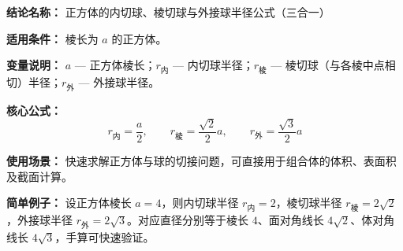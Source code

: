 \textbf{结论名称：} 正方体的内切球、棱切球与外接球半径公式（三合一）

\textbf{适用条件：} 棱长为 \( a \) 的正方体。

\textbf{变量说明：} \( a \) — 正方体棱长；\( r_{\text{内}} \) — 内切球半径；\( r_{\text{棱}} \) — 棱切球（与各棱中点相切）半径；\( r_{\text{外}} \) — 外接球半径。

\textbf{核心公式：}
\[
\boxed{r_{\text{内}} = \frac{a}{2},\qquad r_{\text{棱}} = \frac{\sqrt{2}}{2}a,\qquad r_{\text{外}} = \frac{\sqrt{3}}{2}a}
\]

\textbf{使用场景：} 快速求解正方体与球的切接问题，可直接用于组合体的体积、表面积及截面计算。

\textbf{简单例子：} 设正方体棱长 \( a=4 \)，则内切球半径 \( r_{\text{内}}=2 \)，棱切球半径 \( r_{\text{棱}}=2\sqrt{2} \)，外接球半径 \( r_{\text{外}}=2\sqrt{3} \)。对应直径分别等于棱长 \(4\)、面对角线长 \(4\sqrt{2}\)、体对角线长 \(4\sqrt{3}\)，手算可快速验证。